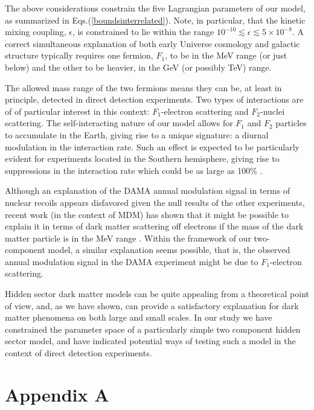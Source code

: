 \documentclass[12pt]{article}
\begin{document}
{{The above considerations constrain the five Lagrangian parameters of our model, as summarized in Eqs.(\ref{boundsinterrelated}). Note, in particular, that the kinetic mixing coupling, $\epsilon$, is constrained to lie within the range $10 ^{-10} \lesssim \epsilon \lesssim 5 \times 10 ^{-8}$. A correct simultaneous explanation of both early Universe cosmology and galactic structure typically requires one fermion, $F_1$, to be in the MeV range (or just below) and the other to be heavier, in the GeV (or possibly TeV) range. 

The allowed mass range of the two fermions means they can be, at least in principle, detected in direct detection experiments. Two types of interactions are of of particular interest in this context: $F_1$-electron scattering and $F_2$-nuclei scattering. The self-interacting nature of our model allows for $F_1$ and $F_2$ particles to accumulate in the Earth, giving rise to a unique signature: a diurnal modulation in the interaction rate. Such an effect is expected to be particularly evident for experiments located in the Southern hemisphere, giving rise to suppressions in the interaction rate which could be as large as 100\% \cite{mine}.

Although an explanation of the DAMA annual modulation signal \cite{dama1} in terms of nuclear recoils appears disfavored given the null results of the other experiments, recent work (in the context of MDM) has shown that it might be possible to explain it in terms of dark matter scattering off electrons if the mass of the dark matter particle is in the MeV range \cite{electronscattering}. Within the framework of our two-component model, a similar explanation seems possible, that is, the observed annual modulation signal in the DAMA experiment might be due to $F_1$-electron scattering.

Hidden sector dark matter models can be quite appealing from a theoretical point of view, and, as we have shown, can provide a satisfactory explanation for dark matter phenomena on both large and small scales. In our study we have constrained the parameter space of a particularly simple two component hidden sector model, and have indicated potential ways of testing such a model in the context of direct detection experiments.


\section*{Appendix A}

}}
\end{document}
